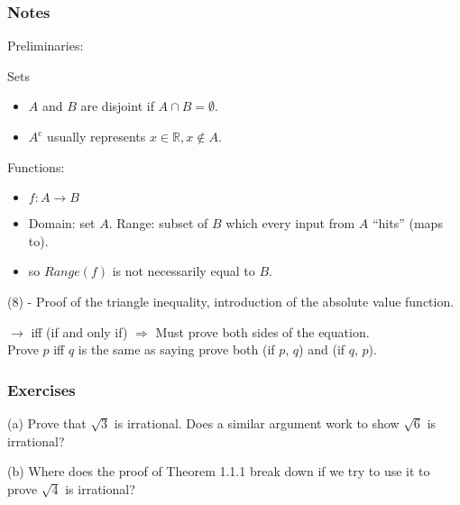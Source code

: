 \documentclass[../analysis_notes.tex]{subfiles}
\begin{document}
\subsubsection{Notes}

Preliminaries:    

Sets
\begin{itemize}
    \addtolength\itemsep{4mm}
    \addtolength\parskip{-8mm}
    \item \( A \) and $B$ are disjoint if $A \cap B = \emptyset$.
    \item $A^{\text{c}}$ usually represents ${x \in \mathbb{R}, x \not \in A}$.
\end{itemize}

Functions:
\begin{itemize}
    \addtolength\itemsep{4mm}
    \addtolength\parskip{-8mm}
    \item $f: A \rightarrow B$
    \item Domain: set $A$. Range: subset of $B$ which every input from $A$ ``hits'' (maps to).
    \item so $Range(f)$ is not necessarily equal to $B$.
\end{itemize}

(8) - Proof of the triangle inequality, introduction of the absolute value function. 

$\rightarrow$ iff (if and only if) $\Rightarrow$ Must prove both sides of the equation. \\ 
Prove $p$ iff $q$ is the same as saying prove both (if $p$, $q$) and (if $q$, $p$).

\hr   
\newpage 



\subsubsection{Exercises}

\begin{exercise}
    \indent
    (a) Prove that \( \sqrt{3} \) is irrational. Does a similar argument work to show \( \sqrt{6} \) is irrational?

    (b) Where does the proof of Theorem 1.1.1 break down if we try to use it to prove \( \sqrt{4} \) is irrational?
\end{exercise}
\end{document}
